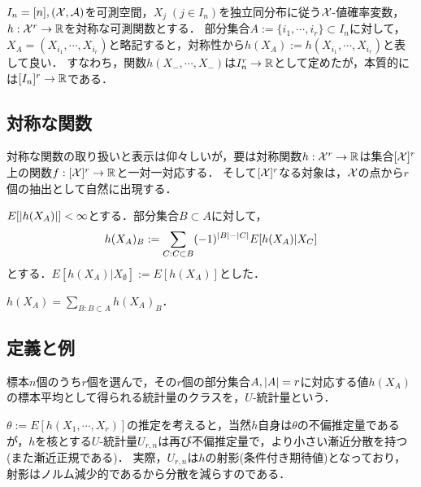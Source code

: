\documentclass[uplatex,dvipdfmx]{jsreport}
\begin{document}
\begin{notation}
    $I_n=[n],(\mathcal{X},\mathcal{A})$を可測空間，$X_j\;(j\in I_n)$を独立同分布に従う$\mathcal{X}$-値確率変数，$h:\mathcal{X}^r\to\mathbb{R}$を対称な可測関数とする．
    部分集合$A:=\{i_1,\cdots,i_r\}\subset I_n$に対して，$X_A=(X_{i_1},\cdots,X_{i_r})$と略記すると，対称性から$h(X_A):=h(X_{i_1},\cdots,X_{i_r})$と表して良い．
    すなわち，関数$h(X_{-},\cdots,X_{-})$は$I_n^r\to\mathbb{R}$として定めたが，本質的には$[I_n]^r\to\mathbb{R}$である．
\end{notation}

\subsection{対称な関数}

\begin{tcolorbox}[colframe=ForestGreen, colback=ForestGreen!10!white,breakable,colbacktitle=ForestGreen!40!white,coltitle=black,fonttitle=\bfseries\sffamily,
title=]
    対称な関数の取り扱いと表示は仰々しいが，要は対称関数$h:\mathcal{X}^r\to\mathbb{R}$は集合$[\mathcal{X}]^r$上の関数$f:[\mathcal{X}]^r\to\mathbb{R}$と一対一対応する．
    そして$[\mathcal{X}]^r$なる対象は，$\mathcal{X}$の点から$r$個の抽出として自然に出現する．
\end{tcolorbox}

\begin{definition}
    $E[\lvert h(X_A)\rvert]<\infty$とする．部分集合$B\subset A$に対して，
    \[h(X_A)_B:=\sum_{C:C\subset B}(-1)^{\lvert B\rvert-\lvert C\rvert}E[h(X_A)|X_C]\]
    とする．$E[h(X_A)|X_{\emptyset}]:=E[h(X_A)]$とした．
\end{definition}

\begin{lemma}[反転公式]
    $h(X_A)=\sum_{B:B\subset A}h(X_A)_B$．
\end{lemma}

\subsection{定義と例}

\begin{tcolorbox}[colframe=ForestGreen, colback=ForestGreen!10!white,breakable,colbacktitle=ForestGreen!40!white,coltitle=black,fonttitle=\bfseries\sffamily,
title=]
    標本$n$個のうち$r$個を選んで，その$r$個の部分集合$A,\lvert A\rvert=r$に対応する値$h(X_A)$の標本平均として得られる統計量のクラスを，$U$-統計量という．

    $\theta:=E[h(X_1,\cdots,X_r)]$の推定を考えると，当然$h$自身は$\theta$の不偏推定量であるが，$h$を核とする$U$-統計量$U_{r,n}$は再び不偏推定量で，より小さい漸近分散を持つ(また漸近正規である)．
    実際，$U_{r,n}$は$h$の射影(条件付き期待値)となっており，射影はノルム減少的であるから分散を減らすのである．
\end{tcolorbox}
\end{document}
